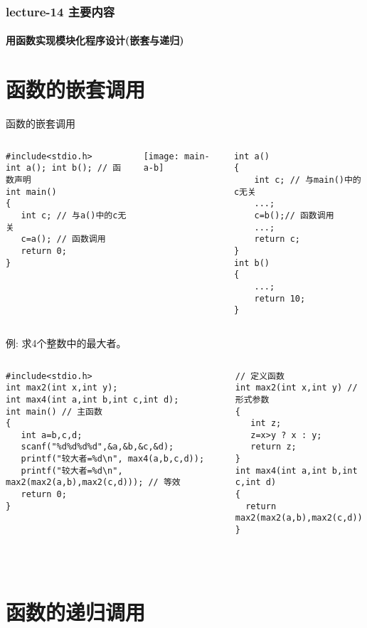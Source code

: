 \begin{frame}[shrink]
  \frametitle{lecture-14 主要内容}
  \framesubtitle{用函数实现模块化程序设计(嵌套与递归)}
  \tableofcontents
\end{frame}

\section{函数的嵌套调用}

\begin{frame}{函数的嵌套调用}
\begin{columns}[T]
\begin{lstlisting}
#include<stdio.h>
int a(); int b(); // 函数声明
int main() 
{ 
   int c; // 与a()中的c无关
   c=a(); // 函数调用
   return 0; 
}
\end{lstlisting}
\texttt{[image: main-a-b]}
\begin{lstlisting}
int a()
{
    int c; // 与main()中的c无关
    ...;
    c=b();// 函数调用
    ...;
    return c;
}
int b()
{
    ...;
    return 10;
}
\end{lstlisting}
\end{columns}
\medskip
\end{frame}


\begin{frame}{例: 求4个整数中的最大者。}
\begin{columns}[T]
\begin{lstlisting}
#include<stdio.h> 
int max2(int x,int y);
int max4(int a,int b,int c,int d); 
int main() // 主函数
{
   int a=b,c,d;
   scanf("%d%d%d%d",&a,&b,&c,&d);
   printf("较大者=%d\n", max4(a,b,c,d));
   printf("较大者=%d\n", max2(max2(a,b),max2(c,d))); // 等效
   return 0; 
}
\end{lstlisting}
\begin{lstlisting}
// 定义函数
int max2(int x,int y) // 形式参数
{  
   int z;
   z=x>y ? x : y;
   return z; 
}
int max4(int a,int b,int c,int d)
{
  return max2(max2(a,b),max2(c,d));
}
\end{lstlisting}
\end{columns}
~\\
\end{frame}

\section{函数的递归调用}

